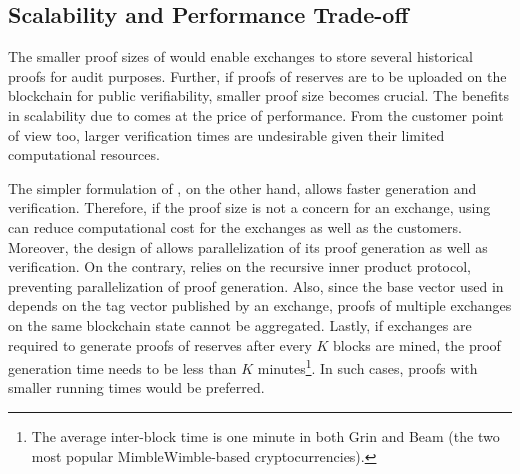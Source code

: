   \subsection{Scalability and Performance Trade-off}
  
  The smaller proof sizes of \RB would enable exchanges to store several historical proofs for audit purposes.
  Further, if proofs of reserves are to be uploaded on the blockchain for public verifiability, smaller proof size becomes crucial.
  The benefits in scalability due to \RB comes at the price of performance.
  From the customer point of view too, larger verification times are undesirable given their limited computational resources.
  
  The simpler formulation of \Rw, on the other hand, allows faster generation and verification. 
  Therefore, if the proof size is not a concern for an exchange, using \R can reduce computational cost for the exchanges as well as the customers. 
  Moreover, the design of \R allows parallelization of its proof generation as well as verification.
  On the contrary, \RB relies on the recursive inner product protocol, preventing parallelization of proof generation.
  Also, since the base vector used in \RB depends on the tag vector published by an exchange, \RB proofs of multiple exchanges on the same blockchain state cannot be aggregated.  
  Lastly, if exchanges are required to generate proofs of reserves after every $K$ blocks are mined, the proof generation time needs to be less than $K$ minutes\footnote{The average inter-block time is one minute in both Grin and Beam (the two most popular MimbleWimble-based cryptocurrencies).}.
  In such cases, proofs with smaller running times would be preferred.
  
  
